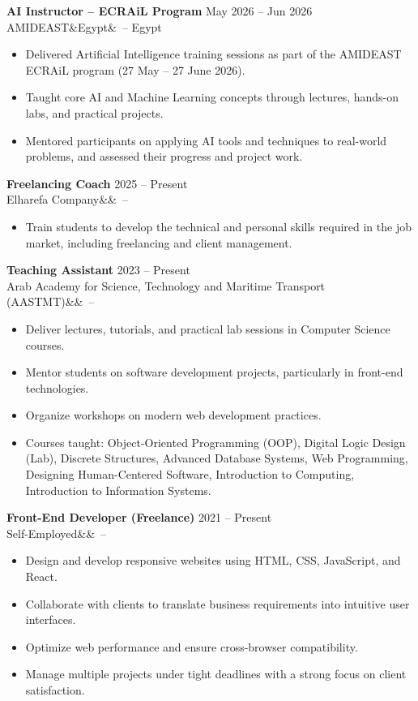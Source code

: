 \documentclass[letterpaper,11pt]{article}
\newcommand{\job}[4]{%
  \textbf{#1} \hfill #4\\
  #2\ifx&#3&\else\ -- #3\fi\par\vspace{1pt}}
\begin{document}
\job{AI Instructor -- ECRAiL Program}{AMIDEAST}{Egypt}{May 2026 -- Jun 2026}
\begin{itemize}
  \item Delivered Artificial Intelligence training sessions as part of the
        AMIDEAST ECRAiL program (27 May -- 27 June 2026).
  \item Taught core AI and Machine Learning concepts through lectures,
        hands-on labs, and practical projects.
  \item Mentored participants on applying AI tools and techniques to
        real-world problems, and assessed their progress and project work.
\end{itemize}

\job{Freelancing Coach}{Elharefa Company}{}{2025 -- Present}
\begin{itemize}
  \item Train students to develop the technical and personal skills
        required in the job market, including freelancing and client
        management.
\end{itemize}

\job{Teaching Assistant}{Arab Academy for Science, Technology and Maritime Transport (AASTMT)}{}{2023 -- Present}
\begin{itemize}
  \item Deliver lectures, tutorials, and practical lab sessions in Computer
        Science courses.
  \item Mentor students on software development projects, particularly in
        front-end technologies.
  \item Organize workshops on modern web development practices.
  \item Courses taught: Object-Oriented Programming (OOP), Digital Logic
        Design (Lab), Discrete Structures, Advanced Database Systems, Web
        Programming, Designing Human-Centered Software, Introduction to
        Computing, Introduction to Information Systems.
\end{itemize}

\job{Front-End Developer (Freelance)}{Self-Employed}{}{2021 -- Present}
\begin{itemize}
  \item Design and develop responsive websites using HTML, CSS, JavaScript,
        and React.
  \item Collaborate with clients to translate business requirements into
        intuitive user interfaces.
  \item Optimize web performance and ensure cross-browser compatibility.
  \item Manage multiple projects under tight deadlines with a strong focus
        on client satisfaction.
\end{itemize}
\end{document}
